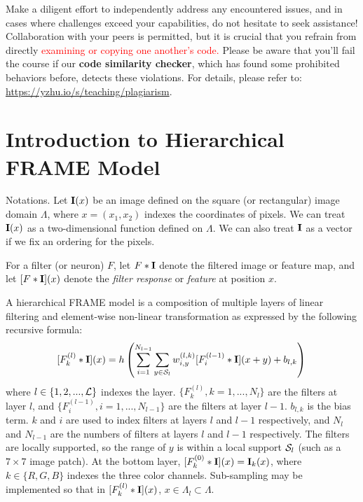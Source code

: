 \documentclass[11pt]{article}
\def\I{{\bf I}}
\def\S{{\cal S}}
\begin{document}
Make a diligent effort to independently address any encountered issues, and in cases where challenges exceed your capabilities, do not hesitate to seek assistance! Collaboration with your peers is permitted, but it is crucial that you refrain from directly \textcolor{red}{examining or copying one another's code.}  Please be aware that you'll fail the course if our \textbf{code similarity checker}, which has found some prohibited behaviors before, detects these violations. For details, please refer to: \url{https://yzhu.io/s/teaching/plagiarism}.

\clearpage

\section{Introduction to Hierarchical FRAME Model}

 Notations. Let $\I(x)$ be an image defined on the square (or rectangular) image domain $\Lambda$, where $x = (x_1, x_2)$ indexes the coordinates of pixels. We can treat $\I(x)$ as a two-dimensional function defined on $\Lambda$. We can also treat $\I$ as a vector if we fix an ordering for the pixels. 

For a filter (or neuron) $F$, let $F*\I$ denote the filtered image or feature map, and let $[F*\I](x)$ denote the {\em filter response} or {\em feature} at position $x$. 

A hierarchical FRAME model is a composition of multiple layers of linear filtering and element-wise non-linear transformation  as expressed by the following recursive formula: 
\begin{equation}
	[F^{(l)}_{k}  *\I](x)  =   h\left(\sum_{i=1}^{N_{l-1}}  \sum_{y \in \S_{l}} w^{(l, k)}_{i, y}   [F^{(l-1)}_{i}*\I](x+y) + b_{l, k}\right) \\
	\label{eq:ConvNet}
\end{equation}
where $l \in \{1, 2, ..., {\cal L}\}$ indexes the layer.  $\{F^{(l)}_k, k = 1, ..., N_l\}$ are the filters at layer $l$, and $\{F^{(l-1)}_i, i = 1, ..., N_{l-1}\}$ are the filters at layer $l-1$. $b_{l,k}$ is the bias term. $k$ and $i$ are used to index filters at layers $l$ and $l-1$ respectively, and $N_l$ and $N_{l-1}$ are the numbers of filters at layers $l$ and $l-1$ respectively. The filters are locally supported, so the range of $y$  is within a local support $\S_{l}$  (such as a $7 \times 7$ image patch). At the bottom layer, $[F^{(0)}_k*\I](x) = \I_k(x)$, where $k \in \{R, G, B\}$ indexes the three color channels. Sub-sampling may be implemented so that in  $[F^{(l)}_{k}  *\I](x)$, $x \in \Lambda_l \subset \Lambda$. 
\end{document}
